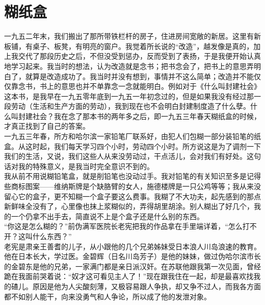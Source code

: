 \fancyhead[RO]{} %
\fancyhead[LE]{} %
\chapter*{糊纸盒}
\thispagestyle{empty}
  一九五二年末，我们搬出了那所带铁栏杆的房子，住进房间宽敞的新居。这里有新板铺，有桌子、板凳，有明亮的窗户。我觉着所长说的“改造”，越发像是真的，加上我交代了那段历史之后，不但没受到惩办，反而受到了表扬，于是我便开始认真地学习起来。我当时的想法，认为改造就是念书；把书念会了，把书上的意思弄明白了，就算是改造成功了。我当时并没有想到，事情并不这么简单；改造并不能仅仅靠念书，书上的意思也并不单靠念一念就能明白。例如对于《什么叫封建社会》这本书，是我早在一九五零年底到一九五一年初念过的，但是如果我没有经过那一段劳动（生活和生产方面的劳动），我到现在也不会明白封建制度造了什么孽。什么叫封建社会？我在念了那本书的两年多之后，即一九五三年春天糊纸盒的时候，才真正找到了自己的答案。\\

一九五三年春，所方和哈尔滨一家铅笔厂联系好，由犯人们包糊一部分装铅笔的纸盒。从这时起，我们每天学习四个小时，劳动四个小时。所方说这是为了调剂一下我们的生活，又说，我们这些人从来没劳动过，干点活儿，会对我们有好处。这句话对我的特殊意义，是我当时完全意识不到的。\\

我从前不用说糊铅笔盒，就是削铅笔也没动过手。我对铅笔的有关知识至多是记得些商标图案——维纳斯牌是个缺胳臂的女人，施德楼牌是一只公鸡等等；我从来没留心它的盒子，更不知糊一个盒子要这么费事。我糊了不大功夫，起先感到的那点新鲜味全没有了，心里像也抹上浆糊似的，弄得胡里胡涂。别人糊出了好几个，我的一个仍拿不出手去，简直说不上是个盒子还是什么别的东西。\\

“你这是怎么糊的？”前伪满军医院长老宪把我的作品拿在手里端详着，“怎么打不开？这叫什么东西？”\\

老宪是肃亲王善耆的儿子，从小跟他的几个兄弟姊妹受日本浪人川岛浪速的教育。他在日本长大，学过医。金碧辉（日名川岛芳子）是他的妹妹，做过伪哈尔滨市长的金碧东是他的兄弟，一家满门都是亲日派汉奸。在苏联他跟我第一次见面，曾经跪在我面前哭着说：“奴才这可看见主人了！”现在跟我住在一起，却是最喜欢找我的碴儿。原因是他为人尖酸刻薄，又极容易跟人争执，却又争不过人，而我各方面都不如别人能干，向来没勇气和人争论，所以成了他的发泄对象。\\

